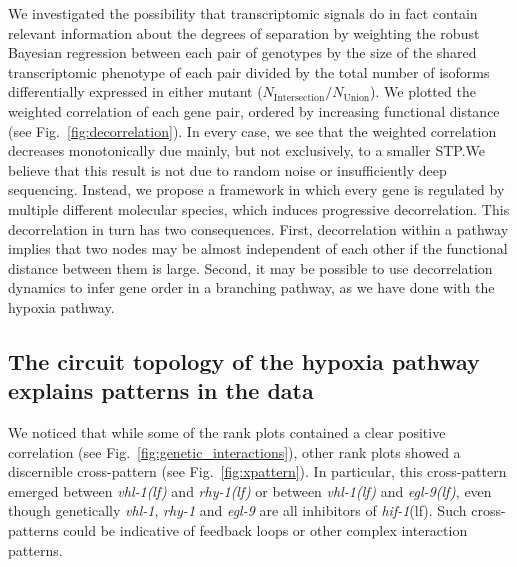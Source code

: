 \documentclass[10pt, onecolumn]{article}
\newcommand{\gene}[1]{\emph{#1}}
\newcommand{\egl}{\emph{\mbox{egl-9}(lf)}}
\newcommand{\rhy}{\emph{\mbox{rhy-1}(lf)}}
\newcommand{\vhl}{\emph{\mbox{vhl-1}(lf)}}
\newcommand{\hif}{\emph{\mbox{hif-1}}(lf)}
\begin{document}
We investigated the possibility that transcriptomic signals do in fact contain
relevant information about the degrees of separation by weighting the robust
Bayesian regression between each pair of genotypes by the size of the shared
transcriptomic phenotype of each pair divided by the total number of isoforms
differentially expressed in either mutant
($N_\mathrm{Intersection}/N_{\mathrm{Union}}$). We plotted the weighted
correlation of each gene pair, ordered by increasing functional distance
(see Fig.~\ref{fig:decorrelation}). In every case, we see that the weighted
correlation decreases monotonically due mainly, but not exclusively, to a smaller
STP.\@ We believe that this result is not due to random noise or insufficiently
deep sequencing. Instead, we propose a framework in which every gene is regulated
by multiple different molecular species, which induces progressive decorrelation.
This decorrelation in turn has two consequences. First, decorrelation within a
pathway implies that two nodes may be almost independent of each other if the
functional distance between them is large. Second, it may be possible to use
decorrelation dynamics to infer gene order in a branching pathway, as we have
done with the hypoxia pathway.

\subsection*{The circuit topology of the hypoxia pathway explains patterns in
            the data}
\label{sub:topology}
We noticed that while some of the rank plots contained a clear positive correlation
(see Fig.~\ref{fig:genetic_interactions}), other rank plots showed
a discernible cross-pattern (see Fig.~\ref{fig:xpattern}). In particular, this
cross-pattern emerged between \vhl{} and \rhy{} or between \vhl{} and \egl{},
even though genetically \gene{vhl-1}, \gene{rhy-1} and \gene{egl-9} are all
inhibitors of \hif{}. Such cross-patterns could be indicative of feedback loops
or other complex interaction patterns.
\end{document}

